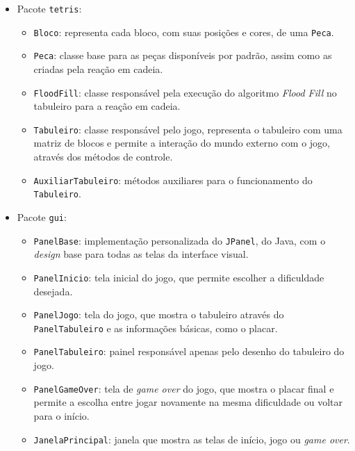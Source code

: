 \documentclass[a4paper, 12pt]{article}
\begin{document}
  \begin{itemize}
    \item Pacote \texttt{tetris}:

    \begin{itemize}
      \item
      \texttt{Bloco}: representa cada bloco, com suas posições
      e cores, de uma \texttt{Peca}.

      \item
      \texttt{Peca}: classe base para as peças disponíveis
      por padrão, assim como as criadas pela reação em cadeia.

      \item
      \texttt{FloodFill}: classe responsável pela execução
      do algoritmo \emph{Flood Fill} no tabuleiro para a 
      reação em cadeia.

      \item
      \texttt{Tabuleiro}: classe responsável pelo jogo, representa
      o tabuleiro com uma matriz de blocos e permite a interação
      do mundo externo com o jogo, através dos métodos de controle.

      \item
      \texttt{AuxiliarTabuleiro}: métodos auxiliares para
      o funcionamento do \texttt{Tabuleiro}.
    \end{itemize}

    \item Pacote \texttt{gui}:

    \begin{itemize}
      \item
      \texttt{PanelBase}: implementação personalizada do
      \texttt{JPanel}, do Java, com o \emph{design} base
      para todas as telas da interface visual.

      \item
      \texttt{PanelInicio}: tela inicial do jogo, que
      permite escolher a dificuldade desejada.

      \item
      \texttt{PanelJogo}: tela do jogo, que mostra
      o tabuleiro através do \texttt{PanelTabuleiro}
      e as informações básicas, como o placar.

      \item
      \texttt{PanelTabuleiro}: painel responsável apenas
      pelo desenho do tabuleiro do jogo.

      \item
      \texttt{PanelGameOver}: tela de \emph{game over}
      do jogo, que mostra o placar final e permite
      a escolha entre jogar novamente na mesma dificuldade
      ou voltar para o início.

      \item
      \texttt{JanelaPrincipal}: janela que mostra as
      telas de início, jogo ou \emph{game over}.
    \end{itemize}
  \end{itemize}
\end{document}
